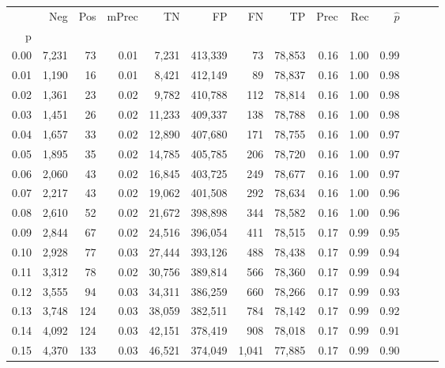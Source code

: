 \begin{tabular}{rrrrrrrrrrrrrr}
\toprule
{} &    Neg &    Pos & mPrec &       TN &       FP &      FN &      TP &  Prec &   Rec & $\hat{p}$ \\
p    &        &        &       &          &          &         &         &       &       &           \\
\midrule
0.00 &  7,231 &     73 &  0.01 &    7,231 &  413,339 &      73 &  78,853 &  0.16 &  1.00 &      0.99 \\
0.01 &  1,190 &     16 &  0.01 &    8,421 &  412,149 &      89 &  78,837 &  0.16 &  1.00 &      0.98 \\
0.02 &  1,361 &     23 &  0.02 &    9,782 &  410,788 &     112 &  78,814 &  0.16 &  1.00 &      0.98 \\
0.03 &  1,451 &     26 &  0.02 &   11,233 &  409,337 &     138 &  78,788 &  0.16 &  1.00 &      0.98 \\
0.04 &  1,657 &     33 &  0.02 &   12,890 &  407,680 &     171 &  78,755 &  0.16 &  1.00 &      0.97 \\
0.05 &  1,895 &     35 &  0.02 &   14,785 &  405,785 &     206 &  78,720 &  0.16 &  1.00 &      0.97 \\
0.06 &  2,060 &     43 &  0.02 &   16,845 &  403,725 &     249 &  78,677 &  0.16 &  1.00 &      0.97 \\
0.07 &  2,217 &     43 &  0.02 &   19,062 &  401,508 &     292 &  78,634 &  0.16 &  1.00 &      0.96 \\
0.08 &  2,610 &     52 &  0.02 &   21,672 &  398,898 &     344 &  78,582 &  0.16 &  1.00 &      0.96 \\
0.09 &  2,844 &     67 &  0.02 &   24,516 &  396,054 &     411 &  78,515 &  0.17 &  0.99 &      0.95 \\
0.10 &  2,928 &     77 &  0.03 &   27,444 &  393,126 &     488 &  78,438 &  0.17 &  0.99 &      0.94 \\
0.11 &  3,312 &     78 &  0.02 &   30,756 &  389,814 &     566 &  78,360 &  0.17 &  0.99 &      0.94 \\
0.12 &  3,555 &     94 &  0.03 &   34,311 &  386,259 &     660 &  78,266 &  0.17 &  0.99 &      0.93 \\
0.13 &  3,748 &    124 &  0.03 &   38,059 &  382,511 &     784 &  78,142 &  0.17 &  0.99 &      0.92 \\
0.14 &  4,092 &    124 &  0.03 &   42,151 &  378,419 &     908 &  78,018 &  0.17 &  0.99 &      0.91 \\
0.15 &  4,370 &    133 &  0.03 &   46,521 &  374,049 &   1,041 &  77,885 &  0.17 &  0.99 &      0.90 \\

\end{tabular}
